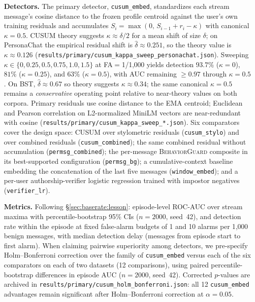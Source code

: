 \documentclass[conference]{IEEEtran}
\newcommand{\BG}{\textsc{BehaviorGuard}}
\begin{document}
\textbf{Detectors.}
The primary detector, \texttt{cusum\_embed}, standardizes each stream message's
cosine distance to the frozen profile centroid against the user's own training
residuals and accumulates $S_i = \max(0,\, S_{i-1} + r_i - \kappa)$ with
canonical $\kappa{=}0.5$.
CUSUM theory suggests $\kappa \approx \delta/2$ for a mean shift of size $\delta$; on
PersonaChat the empirical residual shift is $\hat\delta \approx 0.251$, so the theory
value is $\kappa \approx 0.126$ (\texttt{results/primary/cusum\_kappa\_sweep\_personachat.json}).
Sweeping $\kappa \in \{0, 0.25, 0.5, 0.75, 1.0, 1.5\}$ at FA$=$1/1{,}000 yields
detection $93.7\%$ ($\kappa{=}0$), $81\%$ ($\kappa{=}0.25$), and $63\%$
($\kappa{=}0.5$), with AUC remaining $\ge 0.97$ through $\kappa{=}0.5$.
On BST, $\hat\delta \approx 0.67$ so theory suggests $\kappa \approx 0.34$; the same
canonical $\kappa{=}0.5$ remains a \emph{conservative} operating point relative to
near-theory values on both corpora.
Primary residuals use cosine distance to the EMA centroid; Euclidean and Pearson
correlation on L2-normalized MiniLM vectors are near-redundant with cosine
(\texttt{results/primary/cusum\_kappa\_sweep\_*.json}).
Six comparators cover the design space: CUSUM over stylometric residuals
(\texttt{cusum\_stylo}) and over combined residuals (\texttt{cusum\_combined});
the same combined residual without accumulation (\texttt{permsg\_combined});
the per-message \BG{} composite in its best-supported configuration
(\texttt{permsg\_bg}); a cumulative-context baseline embedding the concatenation of
the last five messages (\texttt{window\_embed}); and a per-user authorship-verifier
logistic regression trained with impostor negatives (\texttt{verifier\_lr}).

\textbf{Metrics.}
Following \S\ref{sec:baserate:lesson}: episode-level ROC-AUC over stream maxima with
percentile-bootstrap 95\% CIs ($n{=}2000$, seed~42), and detection rate within the
episode at fixed false-alarm budgets of 1 and 10 alarms per 1{,}000 benign messages,
with median detection delay (messages from episode start to first alarm).
When claiming pairwise superiority among detectors, we pre-specify
Holm--Bonferroni correction over the family of \texttt{cusum\_embed} versus each of
the six comparators on each of two datasets (12 comparisons), using paired
percentile-bootstrap differences in episode AUC ($n{=}2000$, seed~42).
Corrected $p$-values are archived in \texttt{results/primary/cusum\_holm\_bonferroni.json}:
all 12 \texttt{cusum\_embed} advantages remain significant after Holm--Bonferroni
correction at $\alpha{=}0.05$.
\end{document}
